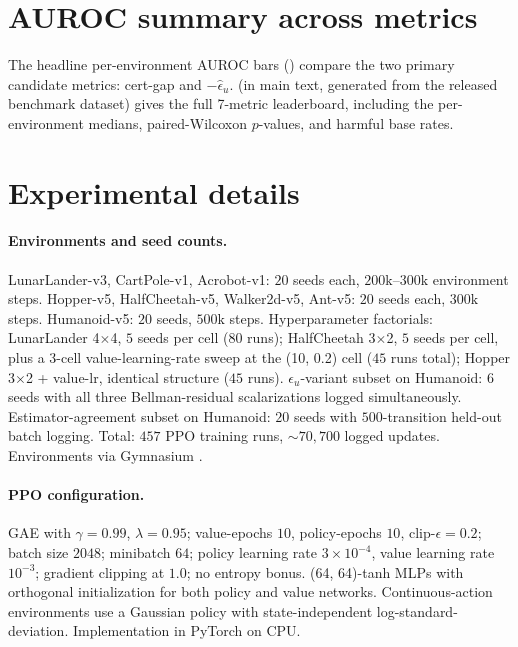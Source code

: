 \documentclass[11pt]{article}
\begin{document}
\section{AUROC summary across metrics}
\label{app:auroc-bars}

The headline per-environment AUROC bars () compare the two primary candidate metrics: cert-gap and $-\widehat\epsilon_u$.  (in main text, generated from the released benchmark dataset) gives the full 7-metric leaderboard, including the per-environment medians, paired-Wilcoxon $p$-values, and harmful base rates.



\section{Experimental details}
\label{app:experiments}

\paragraph{Environments and seed counts.}
LunarLander-v3, CartPole-v1, Acrobot-v1: $20$ seeds each, $200\text{k}$--$300\text{k}$ environment steps. Hopper-v5, HalfCheetah-v5, Walker2d-v5, Ant-v5: $20$ seeds each, $300\text{k}$ steps. Humanoid-v5: $20$ seeds, $500\text{k}$ steps. Hyperparameter factorials: LunarLander 4$\times$4, $5$ seeds per cell ($80$ runs); HalfCheetah 3$\times$2, $5$ seeds per cell, plus a 3-cell value-learning-rate sweep at the (10, 0.2) cell ($45$ runs total); Hopper 3$\times$2 + value-lr, identical structure ($45$ runs). $\epsilon_u$-variant subset on Humanoid: $6$ seeds with all three Bellman-residual scalarizations logged simultaneously. Estimator-agreement subset on Humanoid: $20$ seeds with $500$-transition held-out batch logging. Total: $457$ PPO training runs, $\sim 70{,}700$ logged updates. Environments via Gymnasium \citep{brockman2016openai}.

\paragraph{PPO configuration.}
GAE \citep{schulman2015high} with $\gamma{=}0.99$, $\lambda{=}0.95$; value-epochs $10$, policy-epochs $10$, clip-$\epsilon = 0.2$; batch size $2048$; minibatch $64$; policy learning rate $3{\times}10^{-4}$, value learning rate $10^{-3}$; gradient clipping at $1.0$; no entropy bonus. (64, 64)-tanh MLPs with orthogonal initialization for both policy and value networks. Continuous-action environments use a Gaussian policy with state-independent log-standard-deviation. Implementation in PyTorch on CPU.
\end{document}
